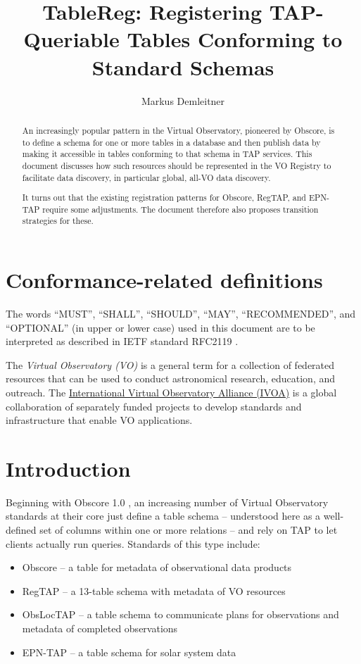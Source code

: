 \documentclass[11pt,a4paper]{ivoa}
\title{TableReg: Registering TAP-Queriable Tables Conforming to Standard
Schemas}
\author[http://www.ivoa.net/cgi-bin/twiki/bin/view/IVOA/MarkusDemleitner]{Markus Demleitner}
\begin{document}
\begin{abstract}
An increasingly popular pattern in the Virtual Observatory, pioneered
by Obscore, is to define a schema for one or more tables in a database
and then publish data by making it accessible in tables conforming to
that schema in TAP services.  This document discusses how such resources
should be represented in the VO Registry to facilitate data discovery,
in particular global, all-VO data discovery.

It turns out that the existing registration patterns for Obscore,
RegTAP, and EPN-TAP require some adjustments.  The document therefore
also proposes transition strategies for these.
\end{abstract}


\section*{Conformance-related definitions}

The words ``MUST'', ``SHALL'', ``SHOULD'', ``MAY'', ``RECOMMENDED'', and
``OPTIONAL'' (in upper or lower case) used in this document are to be
interpreted as described in IETF standard RFC2119 \citep{std:RFC2119}.

The \emph{Virtual Observatory (VO)} is a
general term for a collection of federated resources that can be used
to conduct astronomical research, education, and outreach.
The \href{https://www.ivoa.net}{International
Virtual Observatory Alliance (IVOA)} is a global
collaboration of separately funded projects to develop standards and
infrastructure that enable VO applications.


\section{Introduction}

Beginning with Obscore 1.0 \citep{2011ivoa.spec.1028T}, an increasing
number of Virtual Observatory standards at their core just define a
table schema -- understood here as a well-defined set of columns within
one or more relations -- and rely on TAP \citep{2019ivoa.spec.0927D} to
let clients actually run queries.  Standards of this type include:

\begin{itemize}
\item Obscore \citep{2017ivoa.spec.0509L} -- a table for metadata of
observational data products
\item RegTAP \citep{2019ivoa.spec.1011D} -- a 13-table schema with
metadata of VO resources
\item ObsLocTAP \citep{2021ivoa.spec.0724S} -- a table schema to
communicate plans for observations and metadata of completed
observations
\item EPN-TAP \citep{2022ivoa.spec.0822E} -- a table schema for solar
system data
\end{itemize}
\end{document}
